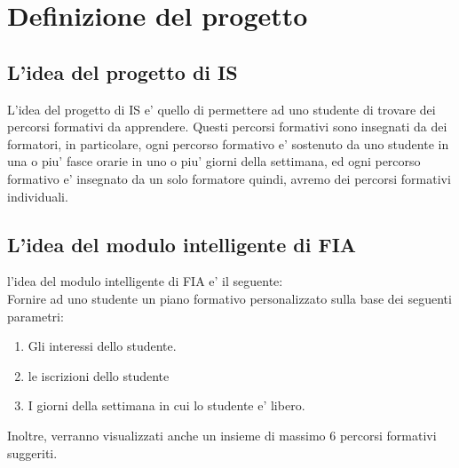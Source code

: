 \documentclass[10pt,a4paper]{article}
\begin{document}
   
  \tableofcontents
  
  \section{Definizione del progetto}
    \label{definizioneDelProgettoSection}
    
    \subsection{L'idea del progetto di IS}
      \label{ideaDelProgettoDiISSubsection}
      L'idea del progetto di IS e' quello di permettere ad uno studente di trovare dei 
      percorsi formativi da apprendere. Questi percorsi formativi sono insegnati da dei 
      formatori, in particolare, ogni percorso formativo e' sostenuto da uno studente in 
      una o piu' fasce orarie in uno o piu' giorni della settimana, ed ogni percorso 
      formativo e' insegnato da un solo formatore quindi, avremo dei percorsi formativi 
      individuali.%
        
    \subsection{L'idea del modulo intelligente di FIA}
      \label{ideaDelModuloIntelligenteDiFIASubsection}
      l'idea del modulo intelligente di FIA e' il seguente:\\
      Fornire ad uno studente un piano formativo personalizzato sulla base dei seguenti 
      parametri:\\
      \begin{enumerate}
        \item Gli interessi dello studente.
        \item le iscrizioni dello studente
        \item I giorni della settimana in cui lo studente e' libero.
      \end{enumerate}%
      Inoltre, verranno visualizzati anche un insieme di massimo 6 percorsi formativi suggeriti.
        
\end{document}

